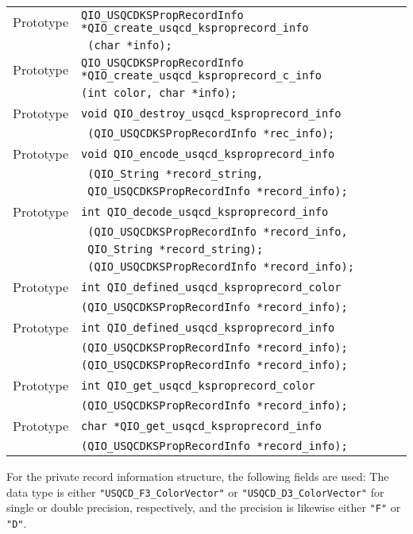 \documentclass{article}
\begin{document}
\begin{flushleft}
  \begin{tabular}{|l|l|}
  \hline
Prototype      & \verb|QIO_USQCDKSPropRecordInfo *QIO_create_usqcd_ksproprecord_info|\\
                 & \verb| (char *info);|\\
Prototype      & \verb|QIO_USQCDKSPropRecordInfo *QIO_create_usqcd_ksproprecord_c_info|\\
                 & \verb|(int color, char *info);|\\
Prototype      & \verb|void QIO_destroy_usqcd_ksproprecord_info|\\
               & \verb| (QIO_USQCDKSPropRecordInfo *rec_info);|\\
Prototype      & \verb|void QIO_encode_usqcd_ksproprecord_info|\\
               & \verb| (QIO_String *record_string, |\\
               & \verb| QIO_USQCDKSPropRecordInfo *record_info);|\\
Prototype      & \verb|int QIO_decode_usqcd_ksproprecord_info|\\
               & \verb| (QIO_USQCDKSPropRecordInfo *record_info,|\\
               & \verb| QIO_String *record_string);|\\
               & \verb| (QIO_USQCDKSPropRecordInfo *record_info);|\\
Prototype      & \verb|int QIO_defined_usqcd_ksproprecord_color|\\
               & \verb|(QIO_USQCDKSPropRecordInfo *record_info);|\\
Prototype      & \verb|int QIO_defined_usqcd_ksproprecord_info|\\
               & \verb|(QIO_USQCDKSPropRecordInfo *record_info);|\\
               & \verb|(QIO_USQCDKSPropRecordInfo *record_info);|\\
Prototype      & \verb|int QIO_get_usqcd_ksproprecord_color|\\
               & \verb|(QIO_USQCDKSPropRecordInfo *record_info);|\\
Prototype      & \verb|char *QIO_get_usqcd_ksproprecord_info|\\
               & \verb|(QIO_USQCDKSPropRecordInfo *record_info);|\\
  \hline
 \end{tabular}
\end{flushleft}
%

For the private record information structure, the following fields are
used: The data type is either \verb|"USQCD_F3_ColorVector"| or
\verb|"USQCD_D3_ColorVector"| for single or double precision,
respectively, and the precision is likewise either \verb|"F"| or
\verb|"D"|.
\end{document}
